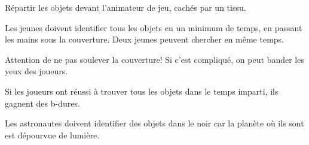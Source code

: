 \documentclass{grand-jeu}
\begin{document}
\begin{liste-materiel}
\end{liste-materiel}

\begin{regles}
Répartir les objets devant l’animateur de jeu, cachés par un tissu. 

Les jeunes doivent identifier tous les objets en un minimum de temps, en passant les mains sous la couverture.
Deux jeunes peuvent chercher en même temps.

Attention de ne pas soulever la couverture! Si c'est compliqué, on peut bander les yeux des joueurs.

Si les joueurs ont réussi à trouver tous les objets dans le temps imparti, ils gagnent des b-dures.
\end{regles}

\begin{imaginaire}
Les astronautes doivent identifier des objets dans le noir car la planète où ils sont est dépourvue de lumière. 
\end{imaginaire}

\begin{moments-stop}
\end{moments-stop}
\end{document}
